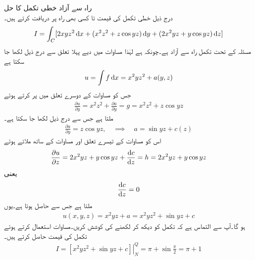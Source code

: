 \quad راہ سے آزاد خطی تکمل کا حل\\
درج ذیل خطی تکمل کی قیمت  تا  کسی بھی راہ پر دریافت کرتے ہیں۔
\begin{align*}
I=\int_C[2xyz^2\dif x+(x^2z^2+z\cos yz)\dif y+(2x^2yz+y\cos yz)\dif z]
\end{align*}
مسئلہ  کے تحت تکمل راہ سے آزاد ہے۔چونکہ  ہے لہٰذا  مساوات  میں دیے پہلا تعلق سے درج ذیل لکھا جا سکتا ہے
\begin{align}\label{مساوات_خطی_تکمل_راہ_سے_آزاد_مثال_الف}
u=\int f\dif x=x^2yz^2+a(y,z)
\end{align} 
جس کو مساوات  کے دوسرے تعلق میں پر کرتے ہوئے
\begin{align*}
\frac{\partial u}{\partial y}=x^2z^2+\frac{\partial a}{\partial y}=g=x^2z^2+z\cos yz
\end{align*}
ملتا ہے جس سے درج ذیل لکھا جا سکتا ہے۔
\begin{align*}
\frac{\partial a}{\partial y}=z\cos yz,\quad \implies \quad a=\sin yz+c(z)
\end{align*}
اس کو مساوات  کے تیسرے تعلق اور مساوات  کے ساتھ ملاتے ہوئے
\begin{align*}
\frac{\partial u}{\partial z}=2x^2yz+y\cos yz+\frac{\dif c}{\dif z}=h=2x^2yz+y\cos yz
\end{align*}
یعنی
\begin{align*}
\frac{\dif c}{\dif z}=0
\end{align*}
ملتا ہے جس سے  حاصل ہوتا ہے۔یوں
\begin{align*}
u(x,y,z)=x^2yz+a=x^2yz^2+\sin yz+c
\end{align*}
ہو گا۔آپ سے التماس ہے کہ تکمل کو دیکھ کر  لکھنے کی کوشش کریں۔مساوات  استعمال کرتے ہوئے تکمل کی قیمت حاصل کرتے ہیں۔
\begin{align*}
I=\left.[x^2yz^2+\sin yz+c]\right|_N^Q=\pi+\sin \frac{\pi}{2}=\pi+1
\end{align*}


